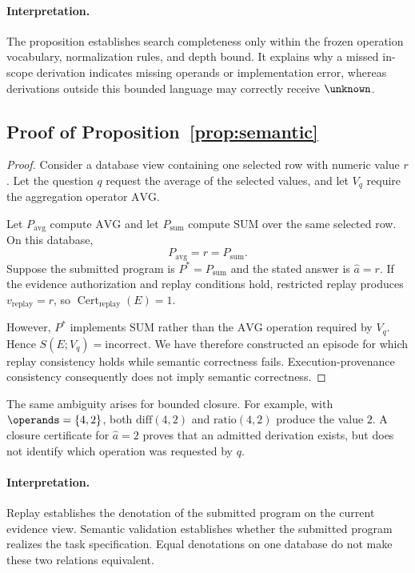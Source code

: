 \paragraph{Interpretation.}
The proposition establishes search completeness only within the
frozen operation vocabulary, normalization rules, and depth
bound. It explains why a missed in-scope derivation indicates
missing operands or implementation error, whereas derivations
outside this bounded language may correctly receive
$\unknown$.

\subsection{Proof of Proposition~\ref{prop:semantic}}

\begin{proof}
Consider a database view containing one selected row with numeric
value $r$. Let the question $q$ request the average of the selected
values, and let $V_q$ require the aggregation operator
$\mathrm{AVG}$.

Let $P_{\mathrm{avg}}$ compute $\mathrm{AVG}$ and let
$P_{\mathrm{sum}}$ compute $\mathrm{SUM}$ over the same selected
row. On this database,
\[
P_{\mathrm{avg}}=r=P_{\mathrm{sum}}.
\]
Suppose the submitted program is $P^*=P_{\mathrm{sum}}$ and the
stated answer is $\hat a=r$. If the evidence authorization and
replay conditions hold, restricted replay produces
$v_{\mathrm{replay}}=r$, so
$\operatorname{Cert}_{\mathrm{replay}}(E)=1$.

However, $P^*$ implements $\mathrm{SUM}$ rather than the
$\mathrm{AVG}$ operation required by $V_q$. Hence
$S(E;V_q)=\mathrm{incorrect}$. We have therefore constructed an
episode for which replay consistency holds while semantic
correctness fails. Execution-provenance consistency consequently
does not imply semantic correctness.
\end{proof}

The same ambiguity arises for bounded closure. For example, with
$\operands=\{4,2\}$, both
$\mathrm{diff}(4,2)$ and $\mathrm{ratio}(4,2)$ produce the value
$2$. A closure certificate for $\hat a=2$ proves that an admitted
derivation exists, but does not identify which operation was
requested by $q$.

\paragraph{Interpretation.}
Replay establishes the denotation of the submitted program on the
current evidence view. Semantic validation establishes whether the
submitted program realizes the task specification. Equal
denotations on one database do not make these two relations
equivalent.

